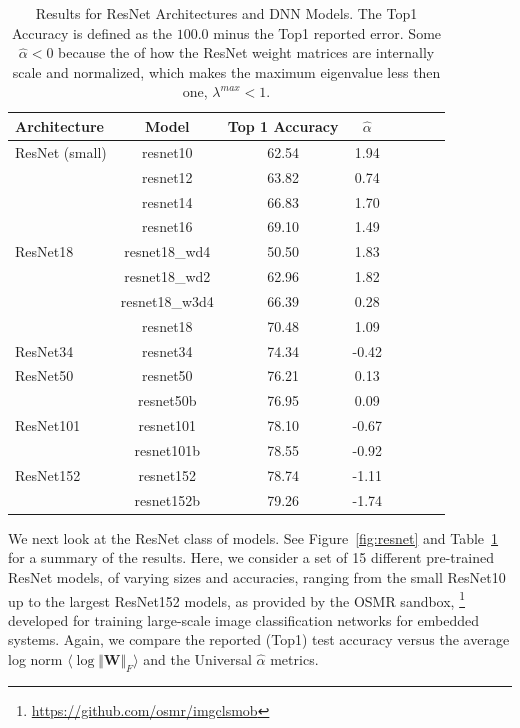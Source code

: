 \begin{table}[t] %
\small
\begin{center}
\begin{tabular}{|p{0.75in}|c|c|c|c|c|c|c|}
\hline
Architecture 
 & Model
 & Top 1 Accuracy & $\hat{\alpha}$ \\
\hline
ResNet (small)   & resnet10 & 62.54 & 1.94 \\
 & resnet12 & 63.82 & 0.74 \\
 & resnet14 & 66.83 & 1.70 \\
 & resnet16 & 69.10 & 1.49 \\
 \hline
 ResNet18  & resnet18\_wd4 & 50.50 & 1.83 \\
 & resnet18\_wd2 & 62.96 & 1.82 \\
 & resnet18\_w3d4 & 66.39 & 0.28 \\
 & resnet18 & 70.48 & 1.09 \\
 \hline
ResNet34 & resnet34 & 74.34 & -0.42 \\
\hline
ResNet50  & resnet50 & 76.21 & 0.13 \\
 & resnet50b & 76.95 & 0.09 \\
 \hline
ResNet101 & resnet101 & 78.10 & -0.67 \\
 & resnet101b & 78.55 & -0.92 \\
\hline
ResNet152 & resnet152 & 78.74 & -1.11 \\
 & resnet152b & 79.26 & -1.74 \\
\hline
\end{tabular}
\end{center}
\caption{Results for ResNet Architectures and DNN Models.  The Top1 Accuracy is defined
as the $100.0$ minus the Top1 reported error.  Some $\hat{\alpha}<0$ because the of how
the ResNet weight matrices are internally scale and normalized, which makes the maximum eigenvalue
less then one, $\lambda^{max}<1$.
        }
\label{table:models_resnet}
\end{table}

We next look at the ResNet class of models. 
See Figure~\ref{fig:resnet} and Table~\ref{table:models_resnet} for a summary of the results.
Here, we consider a set of 15 different pre-trained ResNet models, of varying sizes and accuracies, ranging from the small ResNet10 up to the largest ResNet152 models, as provided by the OSMR sandbox,%
\footnote{\url{https://github.com/osmr/imgclsmob}}
developed for training large-scale image classification networks for embedded systems.
Again, we compare the reported (Top1) test accuracy versus the average log norm $\langle\log\Vert\mathbf{W}\Vert_{F}\rangle$ and the Universal $\hat{\alpha}$ metrics. 

